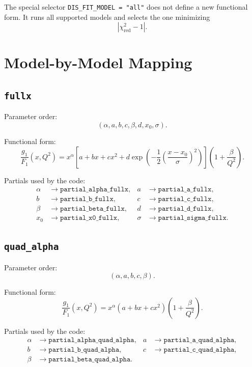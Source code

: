 \documentclass[11pt]{article}
\begin{document}
The special selector \texttt{DIS\_FIT\_MODEL = "all"} does not define a new
functional form.  It runs all supported models and selects the one minimizing
\[
\left| \chi^2_{\mathrm{red}} - 1 \right|.
\]

\section{Model-by-Model Mapping}

\subsection{\texttt{fullx}}

Parameter order:
\[
(\alpha, a, b, c, \beta, d, x_0, \sigma).
\]

Functional form:
\begin{equation}
\frac{g_1}{F_1}(x,Q^2)
=
x^\alpha
\left[
a + bx + cx^2 + d \exp\!\left(-\frac{1}{2}\left(\frac{x-x_0}{\sigma}\right)^2\right)
\right]
\left(1 + \frac{\beta}{Q^2}\right).
\end{equation}

Partials used by the code:
\begin{align*}
\alpha &\rightarrow \texttt{partial\_alpha\_fullx}, &
a      &\rightarrow \texttt{partial\_a\_fullx}, \\
b      &\rightarrow \texttt{partial\_b\_fullx}, &
c      &\rightarrow \texttt{partial\_c\_fullx}, \\
\beta  &\rightarrow \texttt{partial\_beta\_fullx}, &
d      &\rightarrow \texttt{partial\_d\_fullx}, \\
x_0    &\rightarrow \texttt{partial\_x0\_fullx}, &
\sigma &\rightarrow \texttt{partial\_sigma\_fullx}.
\end{align*}

\subsection{\texttt{quad\_alpha}}

Parameter order:
\[
(\alpha, a, b, c, \beta).
\]

Functional form:
\begin{equation}
\frac{g_1}{F_1}(x,Q^2)
=
x^\alpha (a + bx + cx^2)\left(1 + \frac{\beta}{Q^2}\right).
\end{equation}

Partials used by the code:
\begin{align*}
\alpha &\rightarrow \texttt{partial\_alpha\_quad\_alpha}, &
a      &\rightarrow \texttt{partial\_a\_quad\_alpha}, \\
b      &\rightarrow \texttt{partial\_b\_quad\_alpha}, &
c      &\rightarrow \texttt{partial\_c\_quad\_alpha}, \\
\beta  &\rightarrow \texttt{partial\_beta\_quad\_alpha}.
\end{align*}
\end{document}

